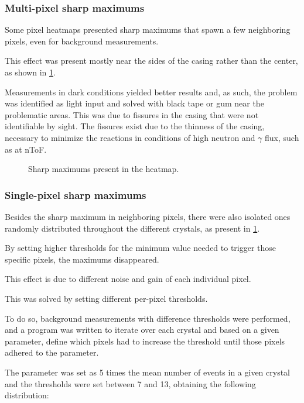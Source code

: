 \subsubsection{Multi-pixel sharp maximums}

Some pixel heatmaps presented sharp maximums that spawn a few neighboring pixels, even for background measurements.

This effect was present mostly near the sides of the casing rather than the center, as shown in \ref{fig:LightHeatmap}.

Measurements in dark conditions yielded better results and, as such, the problem was identified as light input and solved with black tape or gum near the problematic areas. This was due to fissures in the casing that were not identifiable by sight. The fissures exist due to the thinness of the casing, necessary to minimize the reactions in conditions of high neutron and $\gamma$ flux, such as at \ac{nToF}.

\begin{figure}[h!]
    \centering
    \qquad
    \caption{Sharp maximums present in the heatmap.}%
    \label{fig:LightHeatmap}
\end{figure}

\subsubsection{Single-pixel sharp maximums}

Besides the sharp maximum in neighboring pixels, there were also isolated ones randomly distributed throughout the different crystals, as present in \ref{fig:LightHeatmap}.

By setting higher thresholds for the minimum value needed to trigger those specific pixels, the maximums disappeared.

This effect is due to different noise and gain of each individual pixel.

This was solved by setting different per-pixel thresholds.

To do so, background measurements with difference thresholds were performed, and a program was written to iterate over each crystal and based on a given parameter, define which pixels had to increase the threshold until those pixels adhered to the parameter.

The parameter was set as 5 times the mean number of events in a given crystal and the thresholds were set between 7 and 13, obtaining the following distribution:

